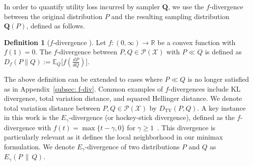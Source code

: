 \documentclass[accepted]{article}
\theoremstyle{plain} %
\theoremstyle{definition}
\newtheorem{definition}{Definition}[section]
\theoremstyle{remark}
\newcommand{\bQ}{\mathbf{Q}}
\newcommand{\SA}[1]{\textbf{\textcolor{Magenta}{[#1]}}}
\begin{document}
In order to quantify utility loss incurred by sampler $\bQ$, we use the \( f \)-divergence between the original distribution \( P \) and the resulting sampling distribution \( \bQ(P) \), defined as follows.
\begin{definition}[$f$-divergence \citep{ali1966general,csiszar1967information}]
\label{def:f-divergence}
Let \( f: (0,\infty) \to \mathbb{R} \) be a convex function with \( f(1) = 0 \). 
The $f$-divergence between $P, Q \in \mathcal{P}(\mathcal{X})$ with $P \ll Q$ is defined as
$
D_f(P \| Q) := \mathbb{E}_Q\Big[ f\left( \frac{dP}{dQ} \right) \Big]
$.


\end{definition}
The above definition can be extended to cases where 
$\displaystyle P\ll Q$ is no longer satisfied as in Appendix~\ref{subsec: f-div}.
 Common examples of \( f \)-divergences include KL divergence, total variation distance, and squared Hellinger distance. We denote total variation distance between $P,Q\in\mathcal{P}(\mathcal{X})$ by \( D_{\mathrm{TV}}(P, Q) \). A key instance in this work is the \( E_\gamma \)-divergence (or hockey-stick divergence), defined as the $f$-divergence with \( f(t) = \max\{t - \gamma, 0\} \) for \( \gamma \geq 1 \)~\citep{sharma2013fundamental}. This divergence is particularly relevant as it defines the local neighborhood in our minimax formulation. We denote $E_\gamma$-divergence of two distributions $P$ and $Q$ as $E_\gamma(P \,\|\, Q)$.



\end{document}
